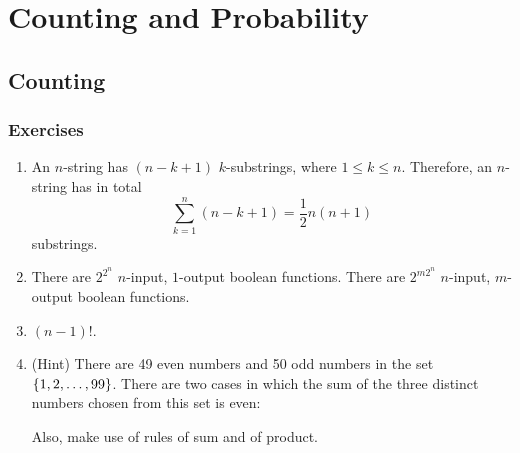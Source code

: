 \setcounter{chapter}{2}
\chapter{Counting and Probability}
\section{Counting}
\subsection*{Exercises}
\begin{enumerate}[\thesection-1]
%
\item An $n$-string has $(n - k + 1)$ $k$-substrings, where $1 \leq k \leq n$. Therefore, an $n$-string has in total
\[
\sum^n_{k = 1} (n - k + 1) = \frac{1}{2}n(n + 1)
\]
substrings.
%
\item There are $2^{2^n}$ $n$-input, $1$-output boolean functions. There are $2^{m2^n}$ $n$-input, $m$-output boolean functions.
%
\item $(n - 1)!$.
%
\item (Hint) There are 49 even numbers and 50 odd numbers in the set $\left\{1, 2, \ldots, 99\right\}$. There are two cases in which the sum of the three distinct numbers chosen from this set is even:  Also, make use of rules of sum and of product.
%
\end{enumerate}
